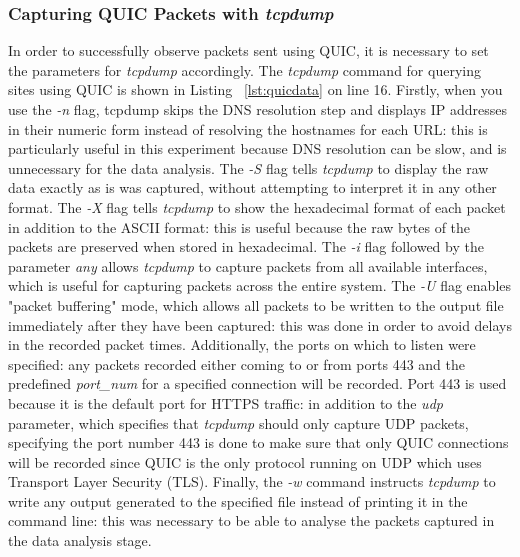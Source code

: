 \documentclass{l4proj}
\begin{document}
\subsubsection{Capturing QUIC Packets with \emph{tcpdump}} In order to successfully observe packets sent using QUIC, it is necessary to set the parameters for \emph{tcpdump} accordingly. The \emph{tcpdump} command for querying sites using QUIC is shown in Listing ~\ref{lst:quicdata} on line 16. Firstly, when you use the \emph{-n} flag, tcpdump skips the DNS resolution step and displays IP addresses in their numeric form instead of resolving the hostnames for each URL: this is particularly useful in this experiment because DNS resolution can be slow, and is unnecessary for the data analysis. The \emph{-S} flag tells \emph{tcpdump} to display the raw data exactly as is was captured, without attempting to interpret it in any other format. The \emph{-X} flag tells \emph{tcpdump} to show the hexadecimal format of each packet in addition to the ASCII format: this is useful because the raw bytes of the packets are preserved when stored in hexadecimal. The \emph{-i} flag followed by the parameter \emph{any} allows \emph{tcpdump} to capture packets from all available interfaces, which is useful for capturing packets across the entire system. The \emph{-U} flag enables "packet buffering" mode, which allows all packets to be written to the output file immediately after they have been captured: this was done in order to avoid delays in the recorded packet times. Additionally, the ports on which to listen were specified: any packets recorded either coming to or from ports 443 and the predefined \emph{port\_num} for a specified connection will be recorded. Port 443 is used because it is the default port for HTTPS traffic: in addition to the \emph{udp} parameter, which specifies that \emph{tcpdump} should only capture UDP packets, specifying the port number 443 is done to make sure that only QUIC connections will be recorded since QUIC is the only protocol running on UDP which uses Transport Layer Security (TLS). Finally, the \emph{-w} command instructs \emph{tcpdump} to write any output generated to the specified file instead of printing it in the command line: this was necessary to be able to analyse the packets captured in the data analysis stage.
\end{document}
